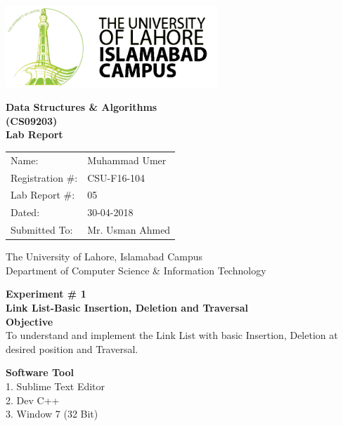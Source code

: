 \documentclass[11pt]{article}            %
\begin{document}
\begin{titlepage}
    \centering
  \vfill
    \includegraphics[width=8cm]{uni_logo.png} \\ 
	\vskip2cm
    {\bfseries\Large
	Data Structures  \& Algorithms \\ (CS09203)\\
	
	\vskip2cm
	Lab Report 
	 
	\vskip2cm
	}    

\begin{center}
\begin{tabular}{ l l  } 

Name: & Muhammad Umer \\ 
Registration \#: & CSU-F16-104 \\ 
Lab Report \#: & 05 \\ 
 Dated:& 30-04-2018\\ 
Submitted To:& Mr. Usman Ahmed\\ 

\end{tabular}
\end{center}
    \vfill
    The University of Lahore, Islamabad Campus\\
Department of Computer Science \& Information Technology
\end{titlepage}


    
    {\bfseries\Large
\centering
	Experiment \# 1 \\

Link List-Basic Insertion, Deletion and Traversal\\
	
	}    
 \vskip1cm
 \textbf {Objective}\\  To understand and implement the Link List with basic Insertion, Deletion at desired position and Traversal.
 
 \textbf {Software Tool} \\
1. Sublime Text Editor\\
2. Dev C++\\
3. Window 7 (32 Bit)\\
\end{document}
